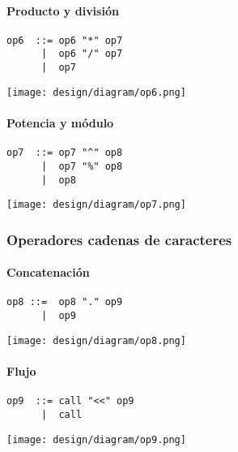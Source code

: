 \paragraph{Producto y división}
\begin{multicols}{2}
\begin{lstlisting}[style=nonumbers]      
op6  ::= op6 "*" op7
      |  op6 "/" op7
      |  op7
\end{lstlisting}  
\columnbreak	
\begin{center}
\texttt{[image: design/diagram/op6.png]} 
\end{center}
\end{multicols}

\paragraph{Potencia y módulo}
\begin{multicols}{2}
\begin{lstlisting}[style=nonumbers]      
op7  ::= op7 "^" op8
      |  op7 "%" op8
      |  op8
\end{lstlisting}  
\columnbreak	
\begin{center}
\texttt{[image: design/diagram/op7.png]} 
\end{center}
\end{multicols}

\subsubsection{Operadores cadenas de caracteres}
\paragraph{Concatenación}
\begin{multicols}{2}
\begin{lstlisting}[style=nonumbers]      
op8 ::=  op8 "." op9
      |  op9
\end{lstlisting}  
\columnbreak	
\begin{center}
\texttt{[image: design/diagram/op8.png]} 
\end{center}
\end{multicols}
\paragraph{Flujo}
\begin{multicols}{2}
\begin{lstlisting}[style=nonumbers]      
op9  ::= call "<<" op9
      |  call
\end{lstlisting}  
\columnbreak	
\begin{center}
\texttt{[image: design/diagram/op9.png]} 
\end{center}
\end{multicols}

